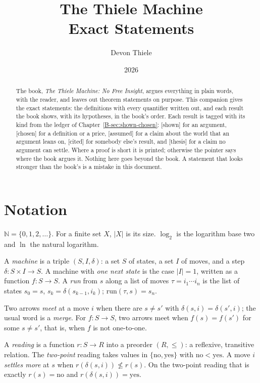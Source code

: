 \documentclass[11pt, a4paper]{article}
\title{The Thiele Machine\\[0.3em]\large Exact Statements}
\author{Devon Thiele}
\date{2026}
\theoremstyle{plain}
\theoremstyle{definition}
\theoremstyle{remark}
\newcommand{\N}{\mathbb{N}}
\newcommand{\Bool}{\{\mathrm{no},\mathrm{yes}\}}
\newcommand{\step}{\delta}
\newcommand{\rd}{r}
\newcommand{\run}{\mathrm{run}}
\newcommand{\kind}[1]{\textup{[#1]}}
\begin{document}
\maketitle

\begin{abstract}
The book, \emph{The Thiele Machine: No Free Insight}, argues everything in plain words, with the reader, and
leaves out theorem statements on purpose. This companion gives the exact statements: the definitions with
every quantifier written out, and each result the book shows, with its hypotheses, in the book's order.
Each result is tagged with its kind from the ledger of Chapter~\ref{B-sec:shown-chosen}: \kind{shown} for
an argument, \kind{chosen} for a definition or a price, \kind{assumed} for a claim about the world that an
argument leans on, \kind{cited} for somebody else's result, and \kind{thesis} for a claim no argument can
settle. Where a proof is short it is printed; otherwise the pointer says where the book argues it. Nothing
here goes beyond the book. A statement that looks stronger than the book's is a mistake in this document.
\end{abstract}

\tableofcontents

\section{Notation}\label{spec:notation}

$\N=\{0,1,2,\dots\}$. For a finite set $X$, $|X|$ is its size. $\log_2$ is the logarithm base two and
$\ln$ the natural logarithm.

A \emph{machine} is a triple $(S,I,\step)$: a set $S$ of states, a set $I$ of moves, and a step
$\step:S\times I\to S$. A machine with \emph{one next state} is the case $|I|=1$, written as a function
$f:S\to S$. A \emph{run} from $s$ along a list of moves $\tau=i_1\cdots i_n$ is the list of states
$s_0=s$, $s_{k}=\step(s_{k-1},i_k)$; $\run(\tau,s)=s_n$.

Two arrows \emph{meet} at a move $i$ when there are $s\ne s'$ with $\step(s,i)=\step(s',i)$; the usual
word is a \emph{merge}. For $f:S\to S$, two arrows meet when $f(s)=f(s')$ for some $s\ne s'$, that is,
when $f$ is not one-to-one.

A \emph{reading} is a function $\rd:S\to R$ into a preorder $(R,\le)$: a reflexive, transitive relation.
The \emph{two-point} reading takes values in $\Bool$ with $\mathrm{no}<\mathrm{yes}$. A move $i$
\emph{settles more} at $s$ when $\rd(\step(s,i))\not\le\rd(s)$. On the two-point reading that is exactly
$\rd(s)=\mathrm{no}$ and $\rd(\step(s,i))=\mathrm{yes}$.
\end{document}
